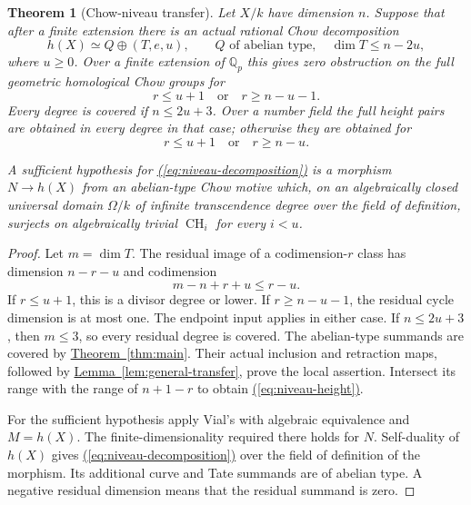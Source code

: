 \documentclass[11pt,a4paper]{article}
\newtheorem{theorem}{Theorem}[section]
\theoremstyle{definition}
\theoremstyle{remark}\newtheorem{remark}[theorem]{Remark}
\numberwithin{equation}{section}
\newcommand{\Q}{\mathbb Q}\newcommand{\R}{\mathbb R}\newcommand{\C}{\mathbb C}
\newcommand{\CH}{\operatorname{CH}}\newcommand{\an}{\mathrm{an}}
\newcommand{\thmref}[1]{\hyperref[#1]{\textcolor{resultlink}{Theorem~\ref*{#1}}}}
\newcommand{\lemref}[1]{\hyperref[#1]{\textcolor{resultlink}{Lemma~\ref*{#1}}}}
\renewcommand{\eqref}[1]{\hyperref[#1]{\textcolor{equationlink}{(\ref*{#1})}}}
\begin{document}
\begin{theorem}[Chow-niveau transfer]\label{thm:niveau}
Let $X/k$ have dimension $n$. Suppose that after a finite extension
there is an actual rational Chow decomposition
\begin{equation}\label{eq:niveau-decomposition}
 h(X)\simeq Q\oplus(T,e,u),\qquad
 Q\text{ of abelian type},\quad \dim T\leq n-2u,
\end{equation}
where $u\geq0$. Over a finite extension of $\Q_p$ this gives zero
obstruction on the full geometric homological Chow groups for
\begin{equation}\label{eq:niveau-local}
 r\leq u+1\quad\text{or}\quad r\geq n-u-1.
\end{equation}
Every degree is covered if $n\leq2u+3$. Over a number field the full
height pairs are obtained in every degree in that case; otherwise
they are obtained for
\begin{equation}\label{eq:niveau-height}
 r\leq u+1\quad\text{or}\quad r\geq n-u.
\end{equation}

A sufficient hypothesis for \eqref{eq:niveau-decomposition} is a
morphism $N\to h(X)$ from an abelian-type Chow motive which, on an
algebraically closed universal domain $\Omega/k$ of infinite
transcendence degree over the field of definition, surjects on
algebraically trivial $\CH_i$ for every $i<u$.
\end{theorem}

\begin{proof}
Let $m=\dim T$. The residual image of a codimension-$r$ class has
dimension $n-r-u$ and codimension
\begin{equation}\label{eq:residual-degree}
 m-n+r+u\leq r-u.
\end{equation}
If $r\leq u+1$, this is a divisor degree or lower. If
$r\geq n-u-1$, the residual cycle dimension is at most one.
The endpoint input applies in either case. If $n\leq2u+3$, then
$m\leq3$, so every residual degree is covered. The abelian-type
summands are covered by \thmref{thm:main}. Their actual inclusion
and retraction maps, followed by \lemref{lem:general-transfer},
prove the local assertion. Intersect its range with the range of
$n+1-r$ to obtain \eqref{eq:niveau-height}.

For the sufficient hypothesis apply Vial's
\cite[Theorem 3.11]{Vial} with algebraic equivalence and $M=h(X)$.
The finite-dimensionality required there holds for $N$. Self-duality
of $h(X)$ gives \eqref{eq:niveau-decomposition} over the field of
definition of the morphism. Its additional curve and Tate summands
are of abelian type. A negative residual dimension means that the
residual summand is zero.
\end{proof}
\end{document}
